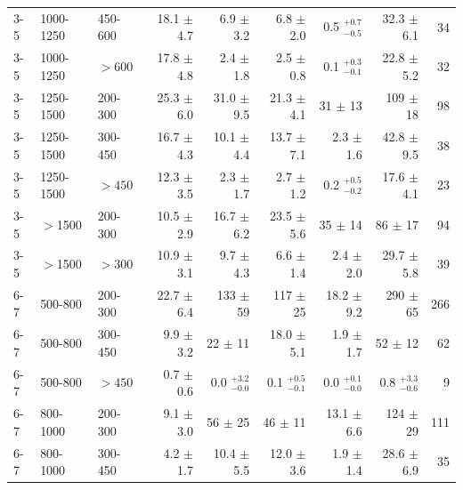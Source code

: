 \begin{table}[!hp]
{\begin{tabular}{lll|r|r|r|r|r|r}
      3-5     & 1000-1250  & 450-600  &   18.1 $\pm$    4.7       &    6.9 $\pm$    3.2      &   6.8 $\pm$    2.0      &  0.5 $^{+0.7}_{-0.5}$       & 32.3   $\pm$    6.1    &    34  \\
      3-5     & 1000-1250  & $>600$   &   17.8 $\pm$    4.8       &    2.4 $\pm$    1.8      &   2.5 $\pm$    0.8      &  0.1 $^{+0.3}_{-0.1}$       & 22.8   $\pm$    5.2    &    32  \\ \hline
      3-5     & 1250-1500  & 200-300  &   25.3 $\pm$    6.0       &   31.0 $\pm$    9.5      &  21.3 $\pm$    4.1      & 31   $\pm$   13         & 109    $\pm$   18      &    98  \\
      3-5     & 1250-1500  & 300-450  &   16.7 $\pm$    4.3       &   10.1 $\pm$    4.4      &  13.7 $\pm$    7.1      &  2.3 $\pm$    1.6       & 42.8   $\pm$    9.5    &    38  \\
      3-5     & 1250-1500  & $>450$   &   12.3 $\pm$    3.5       &    2.3 $\pm$    1.7      &   2.7 $\pm$    1.2      &  0.2 $^{+0.5}_{-0.2}$       & 17.6   $\pm$    4.1    &    23  \\ \hline
      3-5     & $>$1500    & 200-300  &   10.5 $\pm$    2.9       &   16.7 $\pm$    6.2      &  23.5 $\pm$    5.6      & 35   $\pm$   14         & 86     $\pm$   17      &    94  \\
      3-5     & $>$1500    & $>300$   &   10.9 $\pm$    3.1       &    9.7 $\pm$    4.3      &   6.6 $\pm$    1.4      &  2.4 $\pm$    2.0       & 29.7   $\pm$    5.8    &    39  \\ \hline \hline
      6-7     & 500-800    & 200-300  &   22.7 $\pm$    6.4       &  133   $\pm$   59        & 117   $\pm$   25        & 18.2 $\pm$    9.2       & 290    $\pm$   65      &   266  \\
      6-7     & 500-800    & 300-450  &    9.9 $\pm$    3.2       &   22   $\pm$   11        &  18.0 $\pm$    5.1      &  1.9 $\pm$    1.7       & 52     $\pm$   12      &    62  \\
      6-7     & 500-800    & $>450$   &    0.7 $\pm$    0.6       &    0.0 $^{+3.2}_{-0.0}$      &   0.1 $^{+0.5}_{-0.1}$      &  0.0 $^{+0.1}_{-0.0}$       & 0.8    $^{+3.3}_{-0.6}$    &     9  \\ \hline
      6-7     & 800-1000   & 200-300  &    9.1 $\pm$    3.0       &   56   $\pm$   25        &  46   $\pm$   11        & 13.1 $\pm$    6.6       & 124    $\pm$   29      &   111  \\
      6-7     & 800-1000   & 300-450  &    4.2 $\pm$    1.7       &   10.4 $\pm$    5.5      &  12.0 $\pm$    3.6      &  1.9 $\pm$    1.4       & 28.6   $\pm$    6.9    &    35  \\

\end{tabular}}
\end{table}
